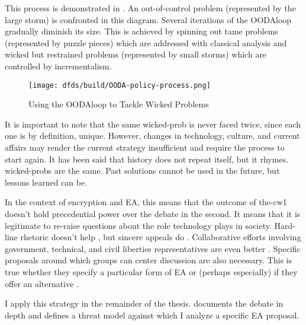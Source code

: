 This process is demonstrated in . An out-of-control problem (represented by the large
storm) is confronted in this diagram. Several iterations of the \ac{OODAloop} gradually diminish its size. This is
achieved by spinning out tame problems (represented by puzzle pieces) which are addressed with classical analysis and
wicked but restrained problems (represented by small storms) which are controlled by \ac{incrementalism}.

\begin{figure}[h]
  \centering\CaptionFontSize
  \texttt{[image: dfds/build/OODA-policy-process.png]}
  \caption{Using the \acs{OODAloop} to Tackle Wicked Problems}
  \label{fig-policy-ooda-process}
\end{figure}

It is important to note that the same \ac{wicked-prob} is never faced twice, since each one is by definition, unique.
However, changes in technology, culture, and current affairs may render the current strategy insufficient and require
the process to start again. It has been said that history does not repeat itself, but it rhymes. \Acp{wicked-prob} are
the same. Past solutions cannot be used in the future, but lessons learned can be.

In the context of \ac{encryption} and \ac{EA}, this means that the outcome of \ac{the-cw1} doesn't hold precedential
power over the debate in the second. It means that it is legitimate to re-raise questions about the role technology
plays in society. Hard-line rhetoric doesn't help \cite{ruiz_there_2018} \cite{geller_2019}, but sincere appeals do
\cite{abelson_2015} \cite{intl_2020} \cite{rozenshtein_2019}. Collaborative efforts involving government, technical, and
civil liberties representatives are even better \cite{committee_decrypting_2018} \cite{group_2019}. Specific proposals
around which groups can center discussion are also necessary. This is true whether they specify a particular form of
\ac{EA} or (perhaps especially) if they offer an alternative \cite{kerr_encryption_2017} \cite{wright_crypto_2018}
\cite{phan_key_2017}.

I apply this strategy in the remainder of the thesis.  documents the debate in depth and
 defines a threat model against which I analyze a specific \ac{EA} proposal.
